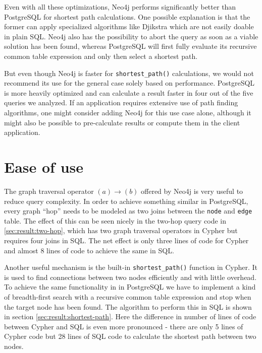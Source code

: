 \documentclass[11pt, a4paper,oneside,chapterprefix=false]{scrbook}
\begin{document}
Even with all these optimizations, Neo4j performs significantly better than PostgreSQL for shortest path calculations.
One possible explanation is that the former can apply specialized algorithms like Djikstra \cite{dijkstra} which are not easily doable in plain SQL. Neo4j also has the possibility to abort the query as soon as a viable solution has been found, whereas PostgreSQL will first fully evaluate its recursive common table expression and only then select a shortest path.

But even though Neo4j is faster for \lstinline{shortest_path()} calculations, we would not recommend its use for the general case solely based on performance. 
PostgreSQL is more heavily optimized and can calculate a result faster in four out of the five queries we analyzed. 
If an application requires extensive use of path finding algorithms, one might consider adding Neo4j for this use case alone, although it might also be possible to pre-calculate results or compute them in the client application.

\section{Ease of use} \label{sec:convenience}

The graph traversal operator $(a) \rightarrow (b)$ offered by Neo4j is very useful to reduce query complexity.
In order to achieve something similar in PostgreSQL, every graph ``hop'' needs to be modeled as two joins between the \lstinline{node} and \lstinline{edge} table.
The effect of this can be seen nicely in the two-hop query code in \ref{sec:result:two-hop}, which has two graph traversal operators in Cypher but requires four joins in SQL. The net effect is only three lines of code for Cypher and almost 8 lines of code to achieve the same in SQL.

Another useful mechanism is the built-in \lstinline{shortest_path()} function in Cypher.
It is used to find connections between two nodes efficiently and with little overhead.
To achieve the same functionality in in PostgreSQL we have to implement a kind of breadth-first search with a recursive common table expression and stop when the target node has been found.
The algorithm to perform this in SQL is shown in section \ref{sec:result:shortest-path}.
Here the difference in number of lines of code between Cypher and SQL is even more pronounced - there are only 5 lines of Cypher code but 28 lines of SQL code to calculate the shortest path between two nodes.
\end{document}
